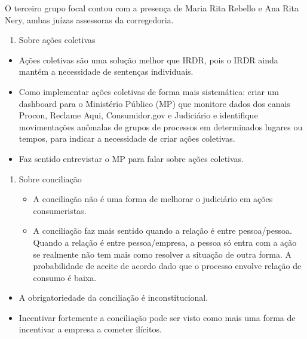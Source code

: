 \documentclass[]{report}
\providecommand{\tightlist}{%
  \setlength{\itemsep}{0pt}\setlength{\parskip}{0pt}}
\begin{document}
O terceiro grupo focal contou com a presença de Maria Rita Rebello e Ana
Rita Nery, ambas juízas assessoras da corregedoria.

\begin{enumerate}
\def\labelenumi{\arabic{enumi}.}
\tightlist
\item
  Sobre ações coletivas
\end{enumerate}

\begin{itemize}
\tightlist
\item
  Ações coletivas são uma solução melhor que IRDR, pois o IRDR ainda
  mantém a necessidade de sentenças individuais.
\item
  Como implementar ações coletivas de forma mais sistemática: criar um
  dashboard para o Ministério Público (MP) que monitore dados dos canais
  Procon, Reclame Aqui, Consumidor.gov e Judiciário e identifique
  movimentações anômalas de grupos de processos em determinados lugares
  ou tempos, para indicar a necessidade de criar ações coletivas.
\item
  Faz sentido entrevistar o MP para falar sobre ações coletivas.
\end{itemize}

\begin{enumerate}
\def\labelenumi{\arabic{enumi}.}
\tightlist
\item
  Sobre conciliação

  \begin{itemize}
  \tightlist
  \item
    A conciliação não é uma forma de melhorar o judiciário em ações
    consumeristas.
  \item
    A conciliação faz mais sentido quando a relação é entre
    pessoa/pessoa. Quando a relação é entre pessoa/empresa, a pessoa só
    entra com a ação se realmente não tem mais como resolver a situação
    de outra forma. A probabilidade de aceite de acordo dado que o
    processo envolve relação de consumo é baixa.
  \end{itemize}
\end{enumerate}

\begin{itemize}
\tightlist
\item
  A obrigatoriedade da conciliação é inconstitucional.
\item
  Incentivar fortemente a conciliação pode ser visto como mais uma forma
  de incentivar a empresa a cometer ilícitos.
\end{itemize}
\end{document}
